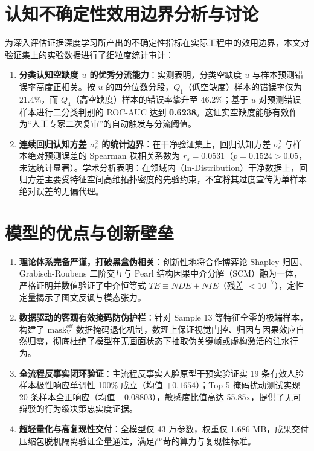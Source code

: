\documentclass{huawei-mcm}
\begin{document}
\section{认知不确定性效用边界分析与讨论}
为深入评估证据深度学习所产出的不确定性指标在实际工程中的效用边界，本文对验证集上的实验数据进行了细粒度统计审计：
\begin{enumerate}[label=\textbf{(\arabic*)}, leftmargin=2.2em]
  \item \textbf{分类认知空缺度 $u$ 的优秀分流能力}：实测表明，分类空缺度 $u$ 与样本预测错误率高度正相关。按 $u$ 的四分位数分段，$Q_1$（低空缺度）样本的错误率仅为 21.4\%，而 $Q_4$（高空缺度）样本的错误率攀升至 46.2\%；基于 $u$ 对预测错误样本进行二分类判别的 ROC-AUC 达到 \textbf{0.6238}。这证实空缺度能够有效作为“人工专家二次复审”的自动触发与分流阈值。
  \item \textbf{连续回归认知方差 $\sigma_e^2$ 的统计边界}：在干净验证集上，回归认知方差 $\sigma_e^2$ 与样本绝对预测误差的 Spearman 秩相关系数为 $r_s = 0.0531$（$p = 0.1524 > 0.05$，未达统计显著）。学术分析表明：在领域内（In-Distribution）干净数据上，回归方差主要受特征空间高维拓扑密度的先验约束，不宜将其过度宣传为单样本绝对误差的无偏代理。
\end{enumerate}

\section{模型的优点与创新壁垒}
\begin{enumerate}[label=\textbf{\arabic*.}]
  \item \textbf{理论体系完备严谨，打破黑盒伪相关}：创新性地将合作博弈论 Shapley 归因、Grabisch-Roubens 二阶交互与 Pearl 结构因果中介分解（SCM）融为一体，严格证明并数值验证了中介恒等式 $TE \equiv NDE + NIE$（残差 $< 10^{-7}$），定性定量揭示了图文反讽与模态张力。
  \item \textbf{数据驱动的客观有效掩码防伪护栏}：针对 Sample 13 等特征全零的极端样本，构建了 $\mathrm{mask}_V^{\mathrm{eff}}$ 数据掩码退化机制，数理上保证视觉门控、归因与因果效应自然归零，彻底杜绝了模型在无画面状态下抽取伪关键帧或虚构激活的注水行为。
  \item \textbf{全流程反事实闭环验证}：主流程反事实人脸原型干预实验证实 19 条有效人脸样本极性响应单调性 100\% 成立（均值 $+0.1654$）；Top-5 掩码扰动测试实现 20 条样本全正响应（均值 $+0.08803$），敏感度比值高达 55.85x，提供了无可辩驳的行为级决策忠实度证据。
  \item \textbf{超轻量化与高复现性交付}：全模型仅 43 万参数，权重仅 1.686 MB，成果交付压缩包脱机隔离验证全量通过，满足严苛的算力与复现性标准。
\end{enumerate}
\end{document}
